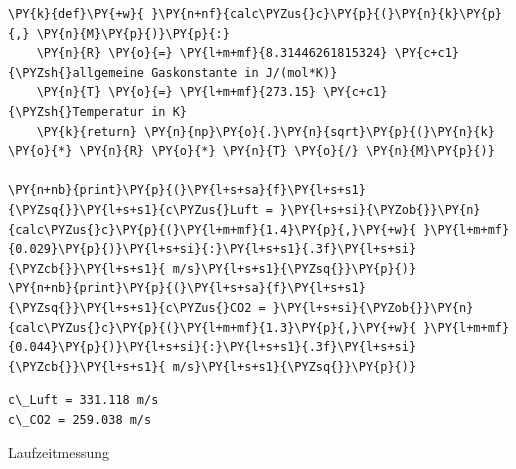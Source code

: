     \begin{tcolorbox}[breakable, size=fbox, boxrule=1pt, pad at break*=1mm,colback=cellbackground, colframe=cellborder]
\begin{Verbatim}[commandchars=\\\{\}]
\PY{k}{def}\PY{+w}{ }\PY{n+nf}{calc\PYZus{}c}\PY{p}{(}\PY{n}{k}\PY{p}{,} \PY{n}{M}\PY{p}{)}\PY{p}{:}
    \PY{n}{R} \PY{o}{=} \PY{l+m+mf}{8.31446261815324} \PY{c+c1}{\PYZsh{}allgemeine Gaskonstante in J/(mol*K)}
    \PY{n}{T} \PY{o}{=} \PY{l+m+mf}{273.15} \PY{c+c1}{\PYZsh{}Temperatur in K}
    \PY{k}{return} \PY{n}{np}\PY{o}{.}\PY{n}{sqrt}\PY{p}{(}\PY{n}{k} \PY{o}{*} \PY{n}{R} \PY{o}{*} \PY{n}{T} \PY{o}{/} \PY{n}{M}\PY{p}{)}

\PY{n+nb}{print}\PY{p}{(}\PY{l+s+sa}{f}\PY{l+s+s1}{\PYZsq{}}\PY{l+s+s1}{c\PYZus{}Luft = }\PY{l+s+si}{\PYZob{}}\PY{n}{calc\PYZus{}c}\PY{p}{(}\PY{l+m+mf}{1.4}\PY{p}{,}\PY{+w}{ }\PY{l+m+mf}{0.029}\PY{p}{)}\PY{l+s+si}{:}\PY{l+s+s1}{.3f}\PY{l+s+si}{\PYZcb{}}\PY{l+s+s1}{ m/s}\PY{l+s+s1}{\PYZsq{}}\PY{p}{)}
\PY{n+nb}{print}\PY{p}{(}\PY{l+s+sa}{f}\PY{l+s+s1}{\PYZsq{}}\PY{l+s+s1}{c\PYZus{}CO2 = }\PY{l+s+si}{\PYZob{}}\PY{n}{calc\PYZus{}c}\PY{p}{(}\PY{l+m+mf}{1.3}\PY{p}{,}\PY{+w}{ }\PY{l+m+mf}{0.044}\PY{p}{)}\PY{l+s+si}{:}\PY{l+s+s1}{.3f}\PY{l+s+si}{\PYZcb{}}\PY{l+s+s1}{ m/s}\PY{l+s+s1}{\PYZsq{}}\PY{p}{)}
\end{Verbatim}
\end{tcolorbox}

    \begin{Verbatim}[commandchars=\\\{\}]
c\_Luft = 331.118 m/s
c\_CO2 = 259.038 m/s
    \end{Verbatim}

    Laufzeitmessung

